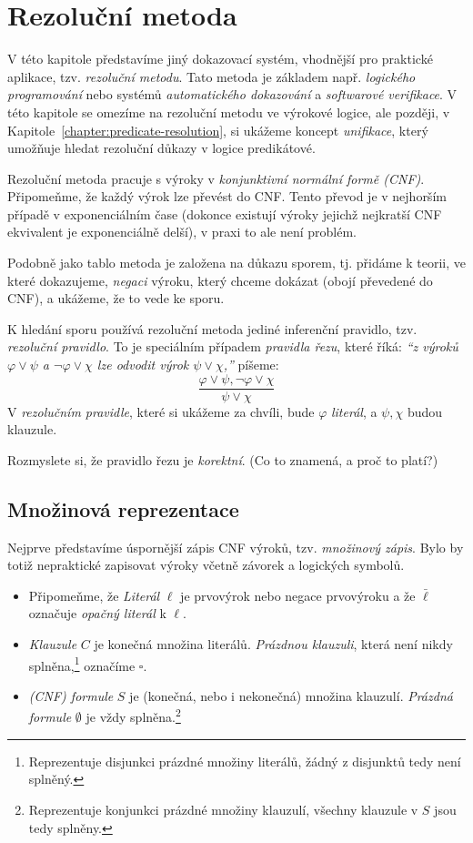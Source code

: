 \chapter{Rezoluční metoda}\label{chapter:propositional-resolution}

V této kapitole představíme jiný dokazovací systém, vhodnější pro praktické aplikace,  tzv. \emph{rezoluční metodu}. Tato metoda je základem např. \emph{logického programování} nebo systémů \emph{automatického dokazování} a \emph{softwarové verifikace}. V této kapitole se omezíme na rezoluční metodu ve výrokové logice, ale později, v Kapitole~\ref{chapter:predicate-resolution}, si ukážeme koncept \emph{unifikace}, který umožňuje hledat rezoluční důkazy v logice predikátové.

Rezoluční metoda pracuje s výroky v \emph{konjunktivní normální formě (CNF)}. Připomeňme, že každý výrok lze převést do CNF. Tento převod je v nejhorším případě v exponenciálním čase (dokonce existují výroky jejichž nejkratší CNF ekvivalent je exponenciálně delší), v praxi to ale není problém.

Podobně jako tablo metoda je založena na důkazu sporem, tj. přidáme k teorii, ve které dokazujeme, \emph{negaci} výroku, který chceme dokázat (obojí převedené do CNF), a ukážeme, že to vede ke sporu.

K hledání sporu používá rezoluční metoda jediné inferenční pravidlo, tzv. \emph{rezoluční pravidlo}. To je speciálním případem \emph{pravidla řezu}, které říká: \emph{``z výroků $\varphi\lor\psi$ a $\neg\varphi\lor\chi$ lze odvodit výrok $\psi\lor\chi$,''} píšeme:
$$
\frac{\varphi\lor\psi,\neg\varphi\lor\chi}{\psi\lor\chi}
$$
V \emph{rezolučním pravidle}, které si ukážeme za chvíli, bude $\varphi$ \emph{literál}, a $\psi,\chi$ budou {klauzule}. 

\begin{exercise}
Rozmyslete si, že pravidlo řezu je \emph{korektní}. (Co to znamená, a proč to platí?)
\end{exercise}

\section{Množinová reprezentace}

Nejprve představíme úspornější zápis CNF výroků, tzv. \emph{množinový zápis}. Bylo by totiž nepraktické zapisovat výroky včetně závorek a logických symbolů.
\begin{itemize}
    \item Připomeňme, že \emph{Literál} $\ell$ je prvovýrok nebo negace prvovýroku  a že $\bar \ell$ označuje \emph{opačný literál} k $\ell$.
    \item \emph{Klauzule} $C$ je konečná množina literálů. \emph{Prázdnou klauzuli}, která není nikdy splněna,\footnote{Reprezentuje disjunkci prázdné množiny literálů, žádný z disjunktů tedy není splněný.} označíme $\square$.
    \item \emph{(CNF) formule} $S$ je (konečná, nebo i nekonečná) množina klauzulí. \emph{Prázdná formule} $\emptyset$ je vždy splněna.\footnote{Reprezentuje konjunkci prázdné množiny klauzulí, všechny klauzule v $S$ jsou tedy splněny.}
\end{itemize}

